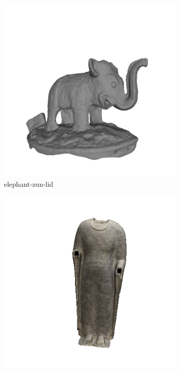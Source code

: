 \begin{figure}[!h]
	\begin{subfigure}[b]{0.23\linewidth}
		\includegraphics[width=\linewidth]{./Figures/train-dataset/44.elephant-zun-lid.png}
		\caption{elephant-zun-lid}
	\end{subfigure}
	\begin{subfigure}[b]{0.23\linewidth}
		\includegraphics[width=\linewidth]{./Figures/train-dataset/45.cosmic-buddha.png}

\end{subfigure}
\end{figure}
